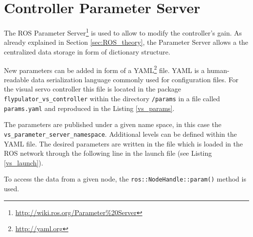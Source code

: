 \pagebreak

\section{Controller Parameter Server}
\label{sec:parameter_server}

The ROS Parameter Server\footnote{\url{http://wiki.ros.org/Parameter\%20Server}}  is used to allow to modify the controller's gain. As already explained in Section \ref{sec:ROS_theory}, the Parameter Server allows a the centralized data storage in form of dictionary structure. 

New parameters can be added in form of a YAML\footnote{\url{http://yaml.org}} file. YAML is a human-readable data serialization language commonly used for configuration files. For the visual servo controller this file is located in the package \texttt{flypulator\_vs\_controller} within the directory \texttt{/params} in a file called \texttt{params.yaml} and reproduced in the Listing \ref{vs_params}.


The parameters are published under a given name space, in this case the \texttt{vs\_parameter\_server\_namespace}. Additional levels can be defined within the YAML file. The desired parameters are written in the file which is loaded in the ROS network through the following line in the launch file (see Listing \ref{vs_launch}).

 To access the data from a given node, the \texttt{ros::NodeHandle::param()} method is used. 

